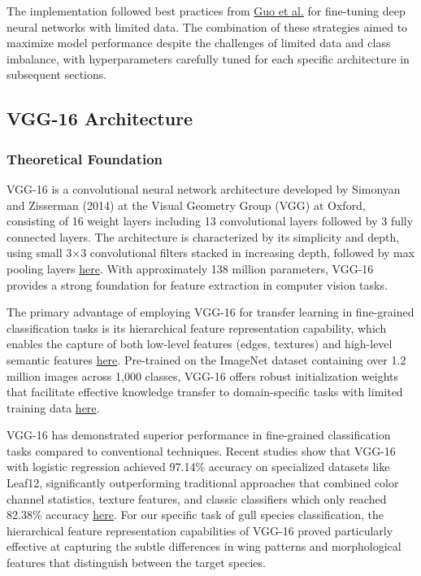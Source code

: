 \documentclass[a4paper,12pt]{article}
\begin{document}
The implementation followed best practices from \href{https://arxiv.org/abs/1810.00736}{Guo et al.} for fine-tuning deep neural networks with limited data. The combination of these strategies aimed to maximize model performance despite the challenges of limited data and class imbalance, with hyperparameters carefully tuned for each specific architecture in subsequent sections.


\citep{simonyan2014vgg}

\subsection{VGG-16 Architecture}

\subsubsection{Theoretical Foundation}


VGG-16 is a convolutional neural network architecture developed by Simonyan and Zisserman (2014) at the Visual Geometry Group (VGG) at Oxford, consisting of 16 weight layers including 13 convolutional layers followed by 3 fully connected layers. The architecture is characterized by its simplicity and depth, using small 3×3 convolutional filters stacked in increasing depth, followed by max pooling layers \href{https://arxiv.org/abs/1409.1556}{here}. With approximately 138 million parameters, VGG-16 provides a strong foundation for feature extraction in computer vision tasks.

The primary advantage of employing VGG-16 for transfer learning in fine-grained classification tasks is its hierarchical feature representation capability, which enables the capture of both low-level features (edges, textures) and high-level semantic features \href{https://proceedings.neurips.cc/paper/2014/file/375c71349b295fbe2dcdca9206f20a06-Paper.pdf}{here}. Pre-trained on the ImageNet dataset containing over 1.2 million images across 1,000 classes, VGG-16 offers robust initialization weights that facilitate effective knowledge transfer to domain-specific tasks with limited training data \href{https://link.springer.com/article/10.1007/s11263-015-0816-y}{here}.

VGG-16 has demonstrated superior performance in fine-grained classification tasks compared to conventional techniques. Recent studies show that VGG-16 with logistic regression achieved 97.14\% accuracy on specialized datasets like Leaf12, significantly outperforming traditional approaches that combined color channel statistics, texture features, and classic classifiers which only reached 82.38\% accuracy \href{https://www.researchgate.net/publication/335846939_Bird_Species_Classification_from_an_Image_Using_VGG-16_Network}{here}. For our specific task of gull species classification, the hierarchical feature representation capabilities of VGG-16 proved particularly effective at capturing the subtle differences in wing patterns and morphological features that distinguish between the target species.
\end{document}
